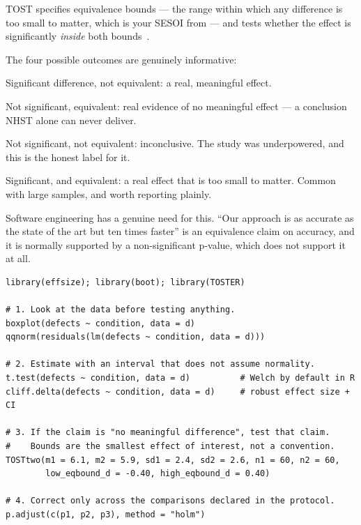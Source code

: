 \begin{conceptbox}
TOST specifies equivalence bounds --- the range within which any difference is
too small to matter, which is your SESOI from  --- and tests
whether the effect is significantly \emph{inside} both
bounds~\cite{lakens2018equivalence}.

\medskip
The four possible outcomes are genuinely informative:

\begin{tight}
  \item Significant difference, not equivalent: a real, meaningful effect.
  \item Not significant, equivalent: real evidence of no meaningful effect ---
    a conclusion NHST alone can never deliver.
  \item Not significant, not equivalent: inconclusive. The study was
    underpowered, and this is the honest label for it.
  \item Significant, and equivalent: a real effect that is too small to matter.
    Common with large samples, and worth reporting plainly.
\end{tight}

\medskip
Software engineering has a genuine need for this. ``Our approach is as accurate
as the state of the art but ten times faster'' is an equivalence claim on
accuracy, and it is normally supported by a non-significant p-value, which does
not support it at all.
\end{conceptbox}

\begin{lstlisting}[language=Rlang, caption={A complete two-group analysis, reported
as an estimate. Note that the significance test is the least of what is
computed.}]
library(effsize); library(boot); library(TOSTER)

# 1. Look at the data before testing anything.
boxplot(defects ~ condition, data = d)
qqnorm(residuals(lm(defects ~ condition, data = d)))

# 2. Estimate with an interval that does not assume normality.
t.test(defects ~ condition, data = d)          # Welch by default in R
cliff.delta(defects ~ condition, data = d)     # robust effect size + CI

# 3. If the claim is "no meaningful difference", test that claim.
#    Bounds are the smallest effect of interest, not a convention.
TOSTtwo(m1 = 6.1, m2 = 5.9, sd1 = 2.4, sd2 = 2.6, n1 = 60, n2 = 60,
        low_eqbound_d = -0.40, high_eqbound_d = 0.40)

# 4. Correct only across the comparisons declared in the protocol.
p.adjust(c(p1, p2, p3), method = "holm")
\end{lstlisting}

